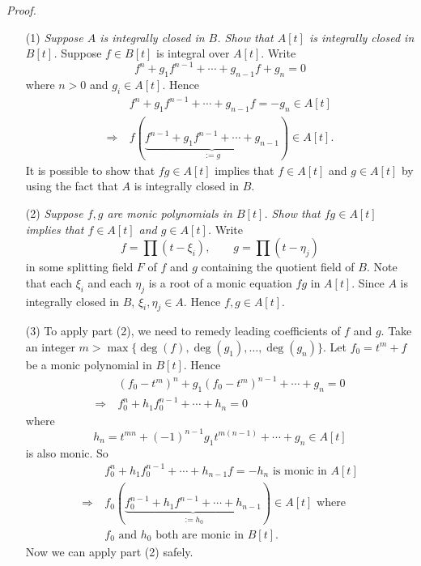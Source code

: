 \documentclass{article}
\begin{document}
\emph{Proof.}
\begin{enumerate}
\item[(1)]
  \emph{Suppose $A$ is integrally closed in $B$.
  Show that $A[t]$ is integrally closed in $B[t]$.}
  Suppose $f \in B[t]$ is integral over $A[t]$.
  Write
  \[
    f^n + g_1 f^{n-1} + \cdots + g_{n-1} f + g_n = 0 
  \]
  where $n > 0$ and $g_i \in A[t]$.
  Hence
  \begin{align*}
    &\:
    f^n + g_1 f^{n-1} + \cdots + g_{n-1} f = -g_n \in A[t] \\
    \Longrightarrow &\:
    f(\underbrace{f^{n-1} + g_1 f^{n-1} + \cdots + g_{n-1}}_{:= g}) \in A[t].
  \end{align*}
  It is possible to show that $fg \in A[t]$ implies that $f \in A[t]$ and $g \in A[t]$
  by using the fact that $A$ is integrally closed in $B$.

\item[(2)]
  \emph{Suppose $f, g$ are monic polynomials in $B[t]$.
  Show that $fg \in A[t]$ implies that $f \in A[t]$ and $g \in A[t]$.}
  Write
  \[
    f = \prod (t - \xi_i),
    \qquad
    g = \prod (t - \eta_j)
  \]
  in some splitting field $F$ of $f$ and $g$ containing the quotient field of $B$.
  Note that each $\xi_i$ and each $\eta_j$ is a root of a monic equation $fg$ in $A[t]$.
  Since $A$ is integrally closed in $B$, $\xi_i, \eta_j \in A$.
  Hence $f, g \in A[t]$.

\item[(3)]
  To apply part (2), we need to remedy leading coefficients of $f$ and $g$.
  Take an integer $m > \max\{\deg(f), \deg(g_1), \ldots, \deg(g_n) \}$.
  Let $f_0 = t^m + f$ be a monic polynomial in $B[t]$.
  Hence
  \begin{align*}
    &\:
    (f_0 - t^m)^n + g_1 (f_0 - t^m)^{n-1} + \cdots + g_n = 0 \\
    \Longrightarrow &\:
    f_0^n + h_1 f_0^{n-1} + \cdots + h_n = 0
  \end{align*}
  where
  \[
    h_n = t^{mn} + (-1)^{n-1} g_1 t^{m(n-1)} + \cdots + g_n \in A[t]
  \]
  is also monic.
  So
  \begin{align*}
    &\:
    f_0^n + h_1 f_0^{n-1} + \cdots + h_{n-1} f = -h_n \text{ is monic in } A[t] \\
    \Longrightarrow &\:
    f_0(\underbrace{f_0^{n-1} + h_1 f^{n-1} + \cdots + h_{n-1}}_{:= h_0}) \in A[t] \text{ where } \\
    &\: \text{$f_0$ and $h_0$ both are monic in } B[t].
  \end{align*}
  Now we can apply part (2) safely.


\end{enumerate}
\end{document}
